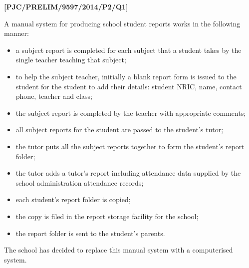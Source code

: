 \item \textbf{{[}PJC/PRELIM/9597/2014/P2/Q1{]} }

A manual system for producing school student reports works in the
following manner: 
\begin{itemize}
\item a subject report is completed for each subject that a student takes
by the single teacher teaching that subject; 
\item to help the subject teacher, initially a blank report form is issued
to the student for the student to add their details: student NRIC,
name, contact phone, teacher and class; 
\item the subject report is completed by the teacher with appropriate comments; 
\item all subject reports for the student are passed to the student's tutor; 
\item the tutor puts all the subject reports together to form the student's
report folder; 
\item the tutor adds a tutor's report including attendance data supplied
by the school administration attendance records; 
\item each student's report folder is copied; 
\item the copy is filed in the report storage facility for the school; 
\item the report folder is sent to the student's parents. 
\end{itemize}
The school has decided to replace this manual system with a computerised
system. 

